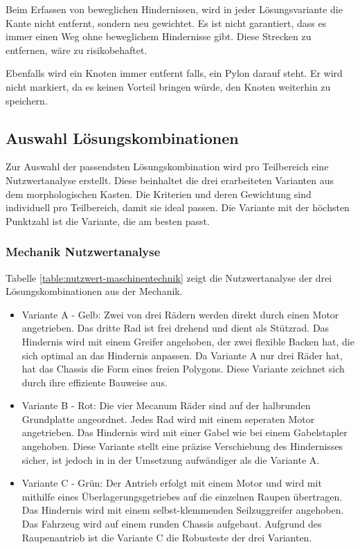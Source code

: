 Beim Erfassen von beweglichen Hindernissen, wird in jeder Lösungsvariante die Kante nicht entfernt, sondern neu gewichtet. Es ist nicht garantiert, dass es immer einen Weg ohne beweglichem Hindernisse gibt. Diese Strecken zu entfernen, wäre zu risikobehaftet.

Ebenfalls wird ein Knoten immer entfernt falls, ein Pylon darauf steht. Er wird nicht markiert, da es  keinen Vorteil bringen würde, den Knoten weiterhin zu speichern.


\newpage
\subsection*{Auswahl Lösungskombinationen}\label{nutzwertanalyse}


Zur Auswahl der passendsten Lösungskombination wird pro Teilbereich eine Nutzwertanalyse erstellt. Diese beinhaltet die drei erarbeiteten Varianten aus dem morphologischen Kasten. Die Kriterien und deren Gewichtung sind individuell pro Teilbereich, damit sie ideal passen. Die Variante mit der höchsten Punktzahl ist die Variante, die am besten passt.

\subsubsection*{Mechanik Nutzwertanalyse}

Tabelle \ref{table:nutzwert-maschinentechnik} zeigt die Nutzwertanalyse der drei Lösungskombinationen aus der Mechanik. 

\begin{itemize}
    \item Variante A - Gelb: Zwei von drei Rädern werden direkt durch einen Motor angetrieben. Das dritte Rad ist frei drehend und dient als Stützrad. Das Hindernis wird mit einem Greifer angehoben, der zwei flexible Backen hat, die sich optimal an das Hindernis anpassen. Da Variante A nur drei Räder hat, hat das Chassis die Form eines freien Polygons. Diese Variante zeichnet sich durch ihre effiziente Bauweise aus. 
    \item Variante B - Rot: Die vier Mecanum Räder sind auf der halbrunden Grundplatte angeordnet. Jedes Rad wird mit einem seperaten Motor angetrieben.  Das Hindernis wird mit einer Gabel wie bei einem Gabelstapler angehoben. Diese Variante stellt eine präzise Verschiebung des Hindernisses sicher, ist jedoch in in der Umsetzung aufwändiger als die Variante A. 
    \item Variante C - Grün: Der Antrieb erfolgt mit einem Motor und wird mit mithilfe eines Überlagerungsgetriebes auf die einzelnen Raupen übertragen.  Das Hindernis wird mit einem selbst-klemmenden Seilzuggreifer angehoben. Das Fahrzeug wird auf einem runden Chassis aufgebaut. Aufgrund des Raupenantrieb ist die Variante C die Robusteste der drei Varianten. 
\end{itemize}

